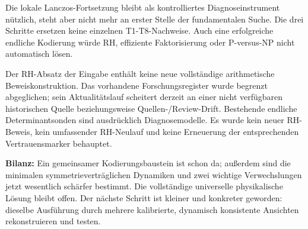 Die lokale Lanczos-Fortsetzung bleibt als kontrolliertes
Diagnoseinstrument nützlich, steht aber nicht mehr an erster Stelle der
fundamentalen Suche. Die drei Schritte ersetzen keine einzelnen
T1-T8-Nachweise. Auch eine erfolgreiche endliche Kodierung würde RH,
effiziente Faktorisierung oder P-versus-NP nicht automatisch lösen.

Der RH-Absatz der Eingabe enthält keine neue vollständige arithmetische
Beweiskonstruktion. Das vorhandene Forschungsregister wurde begrenzt
abgeglichen; sein Aktualitätslauf scheitert derzeit an einer nicht
verfügbaren historischen Quelle beziehungsweise Quellen-/Review-Drift.
Bestehende endliche Determinantsonden sind ausdrücklich Diagnosemodelle.
Es wurde kein neuer RH-Beweis, kein umfassender RH-Neulauf und keine
Erneuerung der entsprechenden Vertrauensmarker behauptet.

\textbf{Bilanz:} Ein gemeinsamer Kodierungsbaustein ist schon da;
außerdem sind die minimalen symmetrieverträglichen Dynamiken und zwei
wichtige Verwechslungen jetzt wesentlich schärfer bestimmt. Die
vollständige universelle physikalische Lösung bleibt offen. Der nächste
Schritt ist kleiner und konkreter geworden: dieselbe Ausführung durch
mehrere kalibrierte, dynamisch konsistente Ansichten rekonstruieren und
testen.

